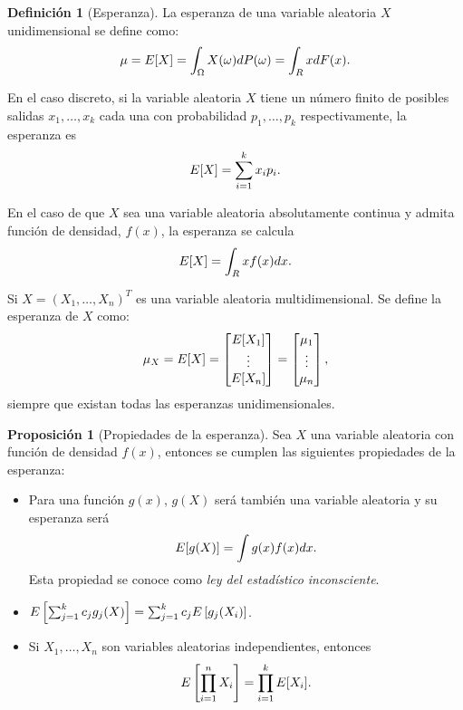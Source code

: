 \documentclass[12pt,a4paper]{report} %
\let\mathbb\relax
\theoremstyle{definition}
\newtheorem{definition}{Definición}[section]
\newtheorem{proposition}[theorem]{Proposición}
\begin{document}
\begin{definition}[Esperanza]
  La esperanza de una variable aleatoria $X$ unidimensional se define como:\[
\mu = \mathbb{E}[X] = \int_{\Omega}X(\omega)dP(\omega) = \int_{\mathbb{R}}xdF(x).
\]

En el caso discreto, si la variable aleatoria $X$ tiene un número finito de posibles salidas $x_1,\dots,x_k$ cada una con probabilidad $p_1,\dots, p_k$ respectivamente, la esperanza es\[
\mathbb{E}[X] = \sum_{i=1}^kx_ip_i.
\]

En el caso de que $X$ sea una variable aleatoria absolutamente continua y admita función de densidad, $f(x)$, la esperanza se calcula\[
\mathbb{E}[X] = \int_{\mathbb{R}}xf(x)dx.
\]
  
  Si  $X=(X_1,\dots,X_n)^T$ es una variable aleatoria multidimensional. Se define la esperanza de $X$ como:\[
\mu_X = \mathbb{E}[X] = \begin{bmatrix}
           \mathbb{E}[X_1] \\
          \vdots \\
          \mathbb{E}[X_n]
         \end{bmatrix}
 = \begin{bmatrix}
           \mu_1 \\
          \vdots \\
          \mu_n
 \end{bmatrix},  \]
 siempre que existan todas las esperanzas unidimensionales.\\
\end{definition}

\begin{proposition}[Propiedades de la esperanza]\label{p:prop_esp}
  Sea $X$ una variable aleatoria con función de densidad $f(x)$, entonces se cumplen las siguientes propiedades de la esperanza:
  \begin{itemize}
  \item Para una función $g(x)$, $g(X)$ será también una variable aleatoria y su esperanza será\[
\mathbb{E}[g(X)] = \int g(x)f(x)dx.
\]
Esta propiedad se conoce como \textit{ley del estadístico inconsciente}.
\item $\mathbb{E}\left [\sum_{j=1}^kc_jg_j(X) \right] = \sum_{j=1}^k c_j \mathbb{E} \left [ g_j(X_i) \right ]$.

\item Si $X_1,\dots,X_n$ son variables aleatorias independientes, entonces\[
\mathbb{E} \left [ \prod_{i=1}^n X_i \right ] = \prod_{i=1}^k\mathbb{E}[X_i].
  \]\\[-10pt]
  \end{itemize}
  
\end{proposition}
\end{document}

